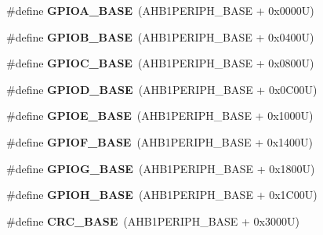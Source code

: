 \begin{DoxyCompactItemize}
\#define {\bfseries G\+P\+I\+O\+A\+\_\+\+B\+A\+SE}~(A\+H\+B1\+P\+E\+R\+I\+P\+H\+\_\+\+B\+A\+SE + 0x0000\+U)
\item 
\mbox{\label{group___peripheral__memory__map_gac944a89eb789000ece920c0f89cb6a68}} 
\#define {\bfseries G\+P\+I\+O\+B\+\_\+\+B\+A\+SE}~(A\+H\+B1\+P\+E\+R\+I\+P\+H\+\_\+\+B\+A\+SE + 0x0400\+U)
\item 
\mbox{\label{group___peripheral__memory__map_ga26f267dc35338eef219544c51f1e6b3f}} 
\#define {\bfseries G\+P\+I\+O\+C\+\_\+\+B\+A\+SE}~(A\+H\+B1\+P\+E\+R\+I\+P\+H\+\_\+\+B\+A\+SE + 0x0800\+U)
\item 
\mbox{\label{group___peripheral__memory__map_ga1a93ab27129f04064089616910c296ec}} 
\#define {\bfseries G\+P\+I\+O\+D\+\_\+\+B\+A\+SE}~(A\+H\+B1\+P\+E\+R\+I\+P\+H\+\_\+\+B\+A\+SE + 0x0\+C00\+U)
\item 
\mbox{\label{group___peripheral__memory__map_gab487b1983d936c4fee3e9e88b95aad9d}} 
\#define {\bfseries G\+P\+I\+O\+E\+\_\+\+B\+A\+SE}~(A\+H\+B1\+P\+E\+R\+I\+P\+H\+\_\+\+B\+A\+SE + 0x1000\+U)
\item 
\mbox{\label{group___peripheral__memory__map_ga7f9a3f4223a1a784af464a114978d26e}} 
\#define {\bfseries G\+P\+I\+O\+F\+\_\+\+B\+A\+SE}~(A\+H\+B1\+P\+E\+R\+I\+P\+H\+\_\+\+B\+A\+SE + 0x1400\+U)
\item 
\mbox{\label{group___peripheral__memory__map_ga5d8ca4020f2e8c00bde974e8e7c13cfe}} 
\#define {\bfseries G\+P\+I\+O\+G\+\_\+\+B\+A\+SE}~(A\+H\+B1\+P\+E\+R\+I\+P\+H\+\_\+\+B\+A\+SE + 0x1800\+U)
\item 
\mbox{\label{group___peripheral__memory__map_gaee4716389f3a1c727495375b76645608}} 
\#define {\bfseries G\+P\+I\+O\+H\+\_\+\+B\+A\+SE}~(A\+H\+B1\+P\+E\+R\+I\+P\+H\+\_\+\+B\+A\+SE + 0x1\+C00\+U)
\item 
\mbox{\label{group___peripheral__memory__map_ga656a447589e785594cbf2f45c835ad7e}} 
\#define {\bfseries C\+R\+C\+\_\+\+B\+A\+SE}~(A\+H\+B1\+P\+E\+R\+I\+P\+H\+\_\+\+B\+A\+SE + 0x3000\+U)

\end{DoxyCompactItemize}
